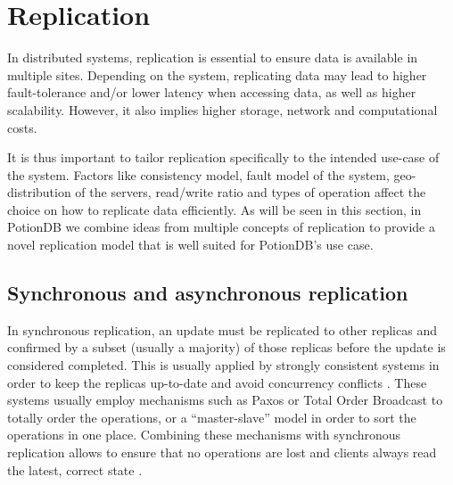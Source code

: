 \section{Replication}
\label{sec:replication}


In distributed systems, replication is essential to ensure data is available in multiple sites.
Depending on the system, replicating data may lead to higher fault-tolerance and/or lower latency when accessing data, as well as higher scalability.
However, it also implies higher storage, network and computational costs.

It is thus important to tailor replication specifically to the intended use-case of the system.
Factors like consistency model, fault model of the system, geo-distribution of the servers, read/write ratio and types of operation affect the choice on how to replicate data efficiently.
As will be seen in this section, in PotionDB we combine ideas from multiple concepts of replication to provide a novel replication model that is well suited for PotionDB's use case.

\subsection{Synchronous and asynchronous replication}
\label{subsec:syncAsync}


In synchronous replication, an update must be replicated to other replicas and confirmed by a subset (usually a majority) of those replicas before the update is considered completed.
This is usually applied by strongly consistent systems in order to keep the replicas up-to-date and avoid concurrency conflicts \cite{dynamo, spanner}.
These systems usually employ mechanisms such as Paxos \cite{paxos} or Total Order Broadcast \cite{tob} to totally order the operations, or a ``master-slave'' model in order to sort the operations in one place.
Combining these mechanisms with synchronous replication allows to ensure that no operations are lost and clients always read the latest, correct state \cite{spanner}.


